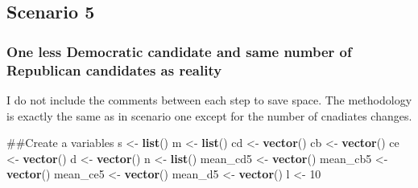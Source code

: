 \documentclass[]{article}
\newenvironment{Shaded}{\begin{snugshade}}{\end{snugshade}}
\newcommand{\KeywordTok}[1]{\textcolor[rgb]{0.13,0.29,0.53}{\textbf{#1}}}
\newcommand{\DataTypeTok}[1]{\textcolor[rgb]{0.13,0.29,0.53}{#1}}
\newcommand{\DecValTok}[1]{\textcolor[rgb]{0.00,0.00,0.81}{#1}}
\newcommand{\StringTok}[1]{\textcolor[rgb]{0.31,0.60,0.02}{#1}}
\newcommand{\ControlFlowTok}[1]{\textcolor[rgb]{0.13,0.29,0.53}{\textbf{#1}}}
\newcommand{\OperatorTok}[1]{\textcolor[rgb]{0.81,0.36,0.00}{\textbf{#1}}}
\newcommand{\NormalTok}[1]{#1}
\begin{document}
\subsection{Scenario 5}\label{scenario-5}

\subsubsection{One less Democratic candidate and same number of
Republican candidates as
reality}\label{one-less-democratic-candidate-and-same-number-of-republican-candidates-as-reality}

I do not include the comments between each step to save space. The
methodology is exactly the same as in scenario one except for the number
of cnadiates changes.

\begin{Shaded}
\begin{Highlighting}[]
\NormalTok{##Create a variables}
\NormalTok{s <-}\StringTok{ }\KeywordTok{list}\NormalTok{()}
\NormalTok{m <-}\StringTok{ }\KeywordTok{list}\NormalTok{()}
\NormalTok{cd <-}\StringTok{ }\KeywordTok{vector}\NormalTok{()}
\NormalTok{cb <-}\StringTok{ }\KeywordTok{vector}\NormalTok{()}
\NormalTok{ce <-}\StringTok{ }\KeywordTok{vector}\NormalTok{()}
\NormalTok{d <-}\StringTok{ }\KeywordTok{vector}\NormalTok{()}
\NormalTok{n <-}\StringTok{ }\KeywordTok{list}\NormalTok{()}
\NormalTok{mean_cd5 <-}\StringTok{ }\KeywordTok{vector}\NormalTok{()}
\NormalTok{mean_cb5 <-}\StringTok{ }\KeywordTok{vector}\NormalTok{()}
\NormalTok{mean_ce5 <-}\StringTok{ }\KeywordTok{vector}\NormalTok{()}
\NormalTok{mean_d5 <-}\StringTok{ }\KeywordTok{vector}\NormalTok{()}
\NormalTok{l <-}\StringTok{ }\DecValTok{10}
\end{Highlighting}
\end{Shaded}

\begin{Shaded}
\end{Shaded}
\end{document}
